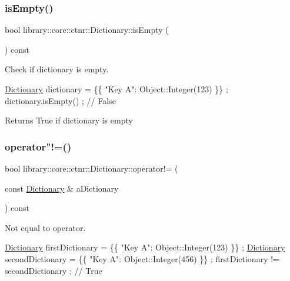 \subsubsection{\texorpdfstring{is\+Empty()}{isEmpty()}}
{\footnotesize\ttfamily bool library\+::core\+::ctnr\+::\+Dictionary\+::is\+Empty (\begin{DoxyParamCaption}{ }\end{DoxyParamCaption}) const}



Check if dictionary is empty. 


\begin{DoxyCode}
\hyperlink{classlibrary_1_1core_1_1ctnr_1_1_dictionary_a823a08112d9ee271f9fa5833f030ea1a}{Dictionary} dictionary = \{\{ \textcolor{stringliteral}{"Key A"}: Object::Integer(123) \}\} ;
dictionary.isEmpty() ; \textcolor{comment}{// False}
\end{DoxyCode}


\begin{DoxyReturn}{Returns}
True if dictionary is empty 
\end{DoxyReturn}
\mbox{\label{classlibrary_1_1core_1_1ctnr_1_1_dictionary_a0aad44089cf59edafc6be85f83534817}} 
\subsubsection{\texorpdfstring{operator"!=()}{operator!=()}}
{\footnotesize\ttfamily bool library\+::core\+::ctnr\+::\+Dictionary\+::operator!= (\begin{DoxyParamCaption}\item[{const \hyperlink{classlibrary_1_1core_1_1ctnr_1_1_dictionary}{Dictionary} \&}]{a\+Dictionary }\end{DoxyParamCaption}) const}



Not equal to operator. 


\begin{DoxyCode}
\hyperlink{classlibrary_1_1core_1_1ctnr_1_1_dictionary_a823a08112d9ee271f9fa5833f030ea1a}{Dictionary} firstDictionary = \{\{ \textcolor{stringliteral}{"Key A"}: Object::Integer(123) \}\} ;
\hyperlink{classlibrary_1_1core_1_1ctnr_1_1_dictionary_a823a08112d9ee271f9fa5833f030ea1a}{Dictionary} secondDictionary = \{\{ \textcolor{stringliteral}{"Key A"}: Object::Integer(456) \}\} ;
firstDictionary != secondDictionary ; \textcolor{comment}{// True}
\end{DoxyCode}



